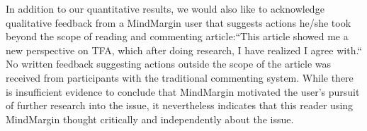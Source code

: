 
In addition to our quantitative results, we would also like to acknowledge qualitative feedback from a MindMargin user that suggests actions he/she took beyond the scope of reading and commenting article:``This article showed me a new perspective on TFA, which after doing research, I have realized I agree with.`` No written feedback suggesting actions outside the scope of the article was received from participants with the traditional commenting system. While there is insufficient evidence to conclude that MindMargin motivated the user's pursuit of further research into the issue, it nevertheless indicates that this reader using MindMargin thought critically and independently about the issue.